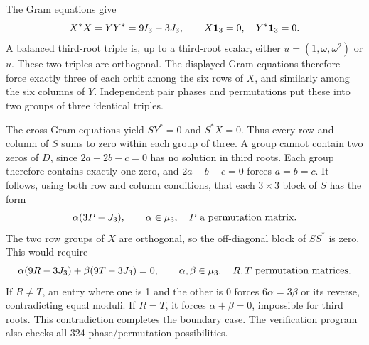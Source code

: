 The Gram equations give
\[
 X^*X=YY^*=9I_3-3J_3,\qquad X\mathbf1_3=0,\quad Y^*\mathbf1_3=0.
\]
A balanced third-root triple is, up to a third-root scalar, either
$u=(1,\omega,\omega^2)$ or $\bar u$. These two triples are orthogonal. The displayed Gram equations therefore force exactly three of each orbit among the six rows of $X$, and similarly among the six columns of $Y$. Independent pair phases and permutations put these into two groups of three identical triples.

The cross-Gram equations yield $SY^*=0$ and $S^*X=0$. Thus every row and column of $S$ sums to zero within each group of three. A group cannot contain two zeros of $D$, since $2a+2b-c=0$ has no solution in third roots. Each group therefore contains exactly one zero, and $2a-b-c=0$ forces $a=b=c$. It follows, using both row and column conditions, that each $3\times3$ block of $S$ has the form
\[
 \alpha(3P-J_3),\qquad \alpha\in\mu_3,\quad P\text{ a permutation matrix}.
\]
The two row groups of $X$ are orthogonal, so the off-diagonal block of $SS^*$ is zero. This would require
\[
 \alpha(9R-3J_3)+\beta(9T-3J_3)=0,
 \qquad\alpha,\beta\in\mu_3,\quad R,T\text{ permutation matrices}.
\]
If $R\ne T$, an entry where one is 1 and the other is 0 forces $6\alpha=3\beta$ or its reverse, contradicting equal moduli. If $R=T$, it forces $\alpha+\beta=0$, impossible for third roots. This contradiction completes the boundary case. The verification program also checks all 324 phase/permutation possibilities.
